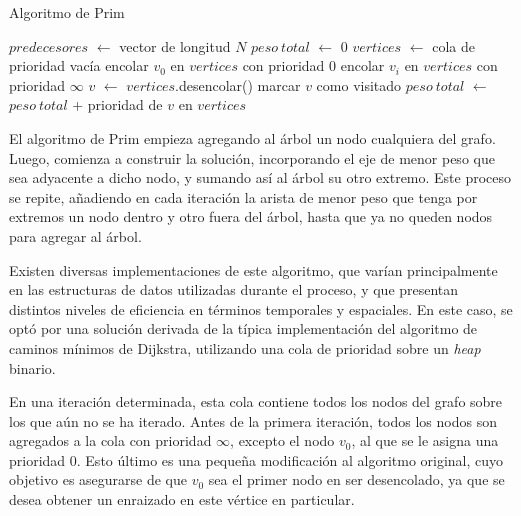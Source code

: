     \begin{algorithm}
        \caption{Algoritmo de Prim}
        \label{algo:prim}

        $predecesores$ $\gets$ vector de longitud $N$ \;
        $peso\ total$ $\gets$ $0$ \;
        $vertices$ $\gets$ cola de prioridad vacía \;
        encolar $v_0$ en $vertices$ con prioridad $0$ \;
         {
            encolar $v_i$ en $vertices$ con prioridad $\infty$ \;
        }
         {
            $v$ $\gets$ $vertices$.desencolar() \;
            marcar $v$ como visitado \;
            $peso\ total$ $\gets$ $peso\ total$ + prioridad de $v$ en $vertices$ \;
        }
    \end{algorithm}

    El algoritmo de Prim empieza agregando al árbol un nodo cualquiera del
    grafo. Luego, comienza a construir la solución, incorporando el eje de
    menor peso que sea adyacente a dicho nodo, y sumando así al árbol su otro
    extremo. Este proceso se repite, añadiendo en cada iteración la arista de
    menor peso que tenga por extremos un nodo dentro y otro fuera del árbol,
    hasta que ya no queden nodos para agregar al árbol.

    Existen diversas implementaciones de este algoritmo, que varían
    principalmente en las estructuras de datos utilizadas durante el proceso,
    y que presentan distintos niveles de eficiencia en términos temporales y
    espaciales. En este caso, se optó por una solución derivada de la
    típica implementación del algoritmo de caminos mínimos de Dijkstra,
    utilizando una cola de prioridad sobre un \emph{heap} binario.

    En una iteración determinada, esta cola contiene todos los nodos del grafo
    sobre los que aún no se ha iterado. Antes de la primera iteración, todos
    los nodos son agregados a la cola con prioridad $\infty$, excepto el nodo
    $v_0$, al que se le asigna una prioridad $0$. Esto último es una pequeña
    modificación al algoritmo original, cuyo objetivo es asegurarse de
    que $v_0$ sea el primer nodo en ser desencolado, ya que se desea obtener
    un  enraizado en este vértice en particular.

